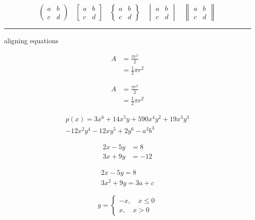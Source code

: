 \documentclass{article}
\begin{document}
\[ \begin{pmatrix} a&b\\c&d \end{pmatrix} \quad
\begin{bmatrix} a&b\\c&d \end{bmatrix} \quad
\begin{Bmatrix} a&b\\c&d \end{Bmatrix} \quad
\begin{vmatrix} a&b\\c&d \end{vmatrix} \quad
\begin{Vmatrix} a&b\\c&d \end{Vmatrix} \]

\noindent\rule{\linewidth}{0.4pt}


\noindent aligning equations

\begin{equation}
    \begin{split}
        A &= \frac{\pi r^2}{2}\\
        &= \frac{1}{2}\pi r^2
    \end{split}
\end{equation}

\[ \begin{split}
    A &= \frac{\pi r^2}{2}\\
    &= \frac{1}{2}\pi r^2
\end{split} \]

\begin{multline}
    p(x) = 3x^6 + 14x^5y + 590x^4y^2 + 19x^3y^3\\
    - 12x^2y^4 - 12xy^5 + 2y^6 - a^3b^3
\end{multline}

\begin{align*}
    2x - 5y &=  8 \\
   3x + 9y &=  -12
\end{align*}

\begin{gather*}
    2x - 5y =  8 \\
    3x^2 + 9y =  3a + c
\end{gather*}

\[ y= \begin{cases}
    -x,\quad x\leq 0 \\
    x,\quad x>0
\end{cases} \]
\end{document}
